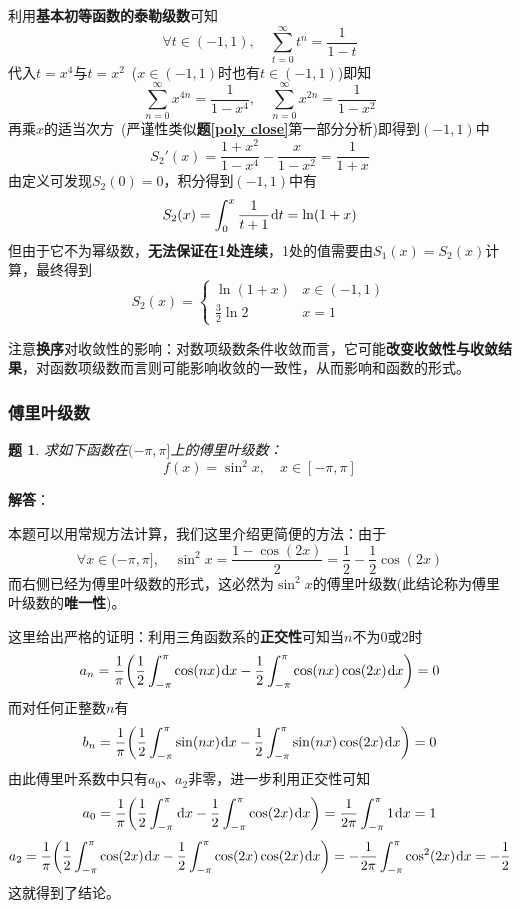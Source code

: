 \documentclass[a4paper,UTF8,fontset=windows,AutoFakeBold]{ctexart}
\newcommand*{\dr}{\hspace{0.07em}\mathrm{d}}
\newcommand*{\suminf}[1][n=1]{\sum_{#1}^\infty}
\newcommand*{\note}{\noindent *}
\theoremstyle{ex}
\newtheorem{exercise}{题}
\newcommand{\exref}[1]{\textbf{题\;\ref{#1}\;}}
\newcommand{\sol}[1]{{\vspace{5pt}\kaishu\noindent\textbf{解答}：\vspace{-3pt}
\begin{compactitem}
    \item[] #1
\end{compactitem}
}}
\begin{document}
\begin{framed}
{\begin{itemize}
        利用\textbf{基本初等函数的泰勒级数}可知
        $$\forall t\in(-1,1),\quad\suminf[t=0]t^n=\frac{1}{1-t}$$
        代入$t=x^4$与$t=x^2$\ ($x\in(-1,1)$时也有$t\in(-1,1)$)即知
        $$\suminf[n=0]x^{4n}=\frac{1}{1-x^4},\quad\suminf[n=0]x^{2n}=\frac{1}{1-x^2}$$
        再乘$x$的适当次方\ (严谨性类似\exref{poly close}第一部分分析)即得到$(-1,1)$中
        $$S_2'(x)=\frac{1+x^2}{1-x^4}-\frac{x}{1-x^2}=\frac{1}{1+x}$$
        由定义可发现$S_2(0)=0$，积分得到$(-1,1)$中有
        $$S_2(x)=\int_0^x\frac{1}{t+1}\dr t=\ln(1+x)$$
        但由于它不为幂级数，\textbf{无法保证在1处连续}，1处的值需要由$S_1(x)=S_2(x)$计算，最终得到
        $$S_2(x)=\begin{cases}\ln(1+x)&x\in(-1,1)\\\frac{3}{2}\ln2&x=1\end{cases}$$
    \end{itemize}
}
\end{framed}

\note 注意\textbf{换序}对收敛性的影响：对数项级数条件收敛而言，它可能\textbf{改变收敛性与收敛结果}，对函数项级数而言则可能影响收敛的一致性，从而影响和函数的形式。

\subsubsection{傅里叶级数}
\begin{framed}
\begin{exercise}
    求如下函数在$(-\pi,\pi]$上的傅里叶级数：
    $$f(x)=\sin^2x,\quad x\in[-\pi,\pi]$$
\end{exercise}
\sol{
    本题可以用常规方法计算，我们这里介绍更简便的方法：由于
    $$\forall x\in(-\pi,\pi],\quad\sin^2x=\frac{1-\cos(2x)}{2}=\frac{1}{2}-\frac{1}{2}\cos(2x)$$
    而右侧已经为傅里叶级数的形式，这必然为$\sin^2x$的傅里叶级数(此结论称为傅里叶级数的\textbf{唯一性})。

    这里给出严格的证明：利用三角函数系的\textbf{正交性}可知当$n$不为0或2时
    $$a_n=\frac{1}{\pi}\bigg(\frac{1}{2}\int_{-\pi}^\pi\cos(nx)\dr x-\frac{1}{2}\int_{-\pi}^{\pi}\cos(nx)\cos(2x)\dr x\bigg)=0$$
    而对任何正整数$n$有
    $$b_n=\frac{1}{\pi}\bigg(\frac{1}{2}\int_{-\pi}^\pi\sin(nx)\dr x-\frac{1}{2}\int_{-\pi}^{\pi}\sin(nx)\cos(2x)\dr x\bigg)=0$$
    由此傅里叶系数中只有$a_0$、$a_2$非零，进一步利用正交性可知
    $$a_0=\frac{1}{\pi}\bigg(\frac{1}{2}\int_{-\pi}^\pi\dr x-\frac{1}{2}\int_{-\pi}^{\pi}\cos(2x)\dr x\bigg)=\frac{1}{2\pi}\int_{-\pi}^\pi1\dr x=1$$
    $$a_2=\frac{1}{\pi}\bigg(\frac{1}{2}\int_{-\pi}^\pi\cos(2x)\dr x-\frac{1}{2}\int_{-\pi}^{\pi}\cos(2x)\cos(2x)\dr x\bigg)=-\frac{1}{2\pi}\int_{-\pi}^\pi\cos^2(2x)\dr x=-\frac{1}{2}$$
    这就得到了结论。
}
\end{framed}
\end{document}
